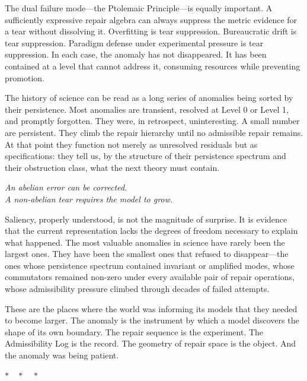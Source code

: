 \documentclass[12pt,oneside]{book}
\theoremstyle{plain}
\theoremstyle{definition}
\theoremstyle{remark}
\newcommand{\1}{\mathbf{1}}
\begin{document}
The dual failure mode---the Ptolemaic Principle---is equally important. A sufficiently expressive repair algebra can always suppress the metric evidence for a tear without dissolving it. Overfitting is tear suppression. Bureaucratic drift is tear suppression. Paradigm defense under experimental pressure is tear suppression. In each case, the anomaly has not disappeared. It has been contained at a level that cannot address it, consuming resources while preventing promotion.

The history of science can be read as a long series of anomalies being sorted by their persistence. Most anomalies are transient, resolved at Level 0 or Level 1, and promptly forgotten. They were, in retrospect, uninteresting. A small number are persistent. They climb the repair hierarchy until no admissible repair remains. At that point they function not merely as unresolved residuals but as specifications: they tell us, by the structure of their persistence spectrum and their obstruction class, what the next theory must contain.

\medskip
\begin{center}
\begin{minipage}{0.8\textwidth}
\centering
\textit{An abelian error can be corrected.}\\[4pt]
\textit{A non-abelian tear requires the model to grow.}
\end{minipage}
\end{center}
\medskip

Saliency, properly understood, is not the magnitude of surprise. It is evidence that the current representation lacks the degrees of freedom necessary to explain what happened. The most valuable anomalies in science have rarely been the largest ones. They have been the smallest ones that refused to disappear---the ones whose persistence spectrum contained invariant or amplified modes, whose commutators remained non-zero under every available pair of repair operations, whose admissibility pressure climbed through decades of failed attempts.

These are the places where the world was informing its models that they needed to become larger. The anomaly is the instrument by which a model discovers the shape of its own boundary. The repair sequence is the experiment. The Admissibility Log is the record. The geometry of repair space is the object. And the anomaly was being patient.

\medskip
\begin{center}
$\ast \quad \ast \quad \ast$
\end{center}
\medskip
\end{document}

